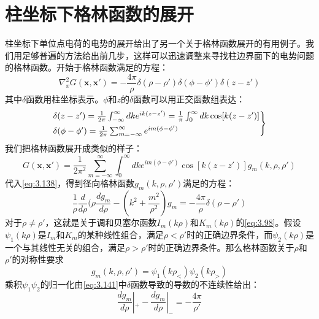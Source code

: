\documentclass[12pt]{book}
\numberwithin{equation}{chapter}
\numberwithin{figure}{chapter}
\numberwithin{footnote}{page}
\begin{document}
\section{柱坐标下格林函数的展开}\label{sec:3.11}

柱坐标下单位点电荷的电势的展开给出了另一个关于格林函数展开的有用例子。我们用足够普遍的方法给出前几步，这样可以迅速调整来寻找柱边界面下的电势问题的格林函数。开始于格林函数满足的方程：
\begin{equation}\label{eq:3.138}
    \nabla^2_x G(\mathbf{x},\mathbf{x'})=-\frac{4\pi}{\rho}\delta(\rho-\rho')\delta(\phi-\phi')\delta(z-z')
\end{equation}
其中$\delta$函数用柱坐标表示。$\phi$和$z$的$\delta$函数可以用正交函数组表达：
\begin{equation}\label{eq:3.139}
    \begin{rcases*}
        \delta(z-z')=\frac{1}{2\pi}\int_{-\infty}^\infty dk e^{ik(z-z')}=\frac{1}{\pi}\int_0^\infty dk \cos[k(z-z')]\\
        \delta(\phi-\phi')=\frac{1}{2\pi}\sum_{m=-\infty}^\infty e^{im(\phi-\phi')}
    \end{rcases*}
\end{equation}
我们把格林函数展开成类似的样子：
\begin{equation}\label{eq:3.140}
    G(\mathbf{x},\mathbf{x'})=\frac{1}{2\pi^2}\sum_{m=-\infty}^\infty \int_0^\infty dk e^{im(\phi-\phi')}\cos[k(z-z')]g_m(k,\rho,\rho')
\end{equation}
代入\autoref{eq:3.138}，得到径向格林函数$g_m(k,\rho,\rho')$满足的方程：
\begin{equation}\label{eq:3.141}
    \frac{1}{\rho}\frac{d}{d\rho}(\rho\frac{dg_m}{d\rho}-(k^2+\frac{m^2}{\rho^2})g_m=-\frac{4\pi}{\rho}\delta(\rho-\rho')
\end{equation}
对于$\rho\neq\rho'$，这就是关于调和贝塞尔函数$I_m(k\rho)$和$K_m(k\rho)$的\autoref{eq:3.98}。假设$\psi_1(k\rho)$是$I_m$和$K_m$的某种线性组合，满足$\rho<\rho'$时的正确边界条件，而$\psi_2(k\rho)$是一个与其线性无关的组合，满足$\rho>\rho'$时的正确边界条件。那么格林函数关于$\rho$和$\rho'$的对称性要求
\begin{equation}\label{eq:3.142}
    g_m(k,\rho,\rho')=\psi_1(k\rho_<)\psi_2(k\rho_>)
\end{equation}
乘积$\psi_1\psi_2$的归一化由\autoref{eq:3.141}中$\delta$函数导致的导数的不连续性给出：
\begin{equation}\label{eq:3.143}
    \frac{dg_m}{d\rho}|_+-\frac{dg_m}{d\rho}|_-=-\frac{4\pi}{\rho'}
\end{equation}
\end{document}
